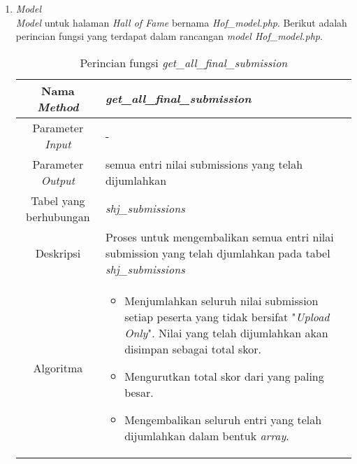 \begin{enumerate}
	\item \textit{Model} \\
	\textit{Model} untuk halaman \textit{Hall of Fame} bernama \textit{Hof\_model.php}. Berikut adalah perincian fungsi yang terdapat dalam rancangan \textit{model Hof\_model.php}.
	\begin{table}[H]
		\caption{Perincian fungsi \textit{get\_all\_final\_submission}}
		\begin{tabular}{|c|p{11cm}|}
			\hline
			Nama \textit{Method} 	& 	\textit{get\_all\_final\_submission} 	\\
			\hline
			Parameter \textit{Input} & - \\
			\hline
			Parameter \textit{Output} & semua entri nilai submissions yang telah dijumlahkan \\
			\hline
			Tabel yang berhubungan & \textit{shj\_submissions} \\
			\hline
			Deskripsi	& Proses untuk mengembalikan semua entri nilai submission yang telah djumlahkan pada tabel \textit{shj\_submissions} \\
			\hline
			Algoritma	& \begin{itemize}
				\item Menjumlahkan seluruh nilai submission setiap peserta yang tidak bersifat "\textit{Upload Only}". Nilai yang telah dijumlahkan akan disimpan sebagai total skor.
				\item Mengurutkan total skor dari yang paling besar.
				\item Mengembalikan seluruh entri yang telah dijumlahkan dalam bentuk \textit{array}.
			\end{itemize} \\
			\hline
		\end{tabular}
	\end{table}
	

\end{enumerate}

